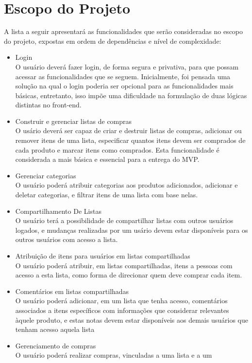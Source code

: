 \section{Escopo do Projeto}
A lista a seguir apresentará as funcionalidades que serão consideradas no escopo do projeto, expostas em
ordem de dependências e nível de complexidade:
\begin{itemize}
\item Login\\
  O usuário deverá fazer login, de forma segura e privativa, para que
  possam acessar as funcionalidades que se seguem. Inicialmente, foi
  pensada uma solução na qual o login poderia ser opcional para as
  funcionalidades mais básicas, entretanto, isso impõe uma dificuldade
  na formulação de duas lógicas distintas no front-end.
\item Construir e gerenciar listas de compras\\
  O usário deverá ser capaz de criar e destruir listas de compras, adicionar ou
  remover itens de uma lista, especificar quantos itens devem ser
  comprados de cada produto e marcar itens como comprados. Esta
  funcionalidade é considerada a mais básica e essencial para a
  entrega do MVP.
\item Gerenciar categorias\\
  O usuário poderá atribuir categorias aos produtos adicionados,
  adicionar e deletar categorias, e filtrar itens de uma lista com base nelas.
\item Compartilhamento De Listas\\
  O usuário terá a possibilidade de compartilhar listas com outros
  usuários logados, e mudanças realizadas por um usário devem estar
  disponíveis para os outros usuários com acesso a lista.
\item Atribuição de itens para usuários em listas compartilhadas\\
  O usuário poderá atribuir, em listas compartilhadas, itens a pessoas
  com acesso a esta lista, como forma de direcionar quem deve comprar
  cada item.
\item Comentários em listas compartilhadas\\
  O usuário poderá adicionar, em um lista que tenha acesso,
  comentários associados a itens específicos com informações que
  considerar relevantes àquele produto, e estas notas devem estar
  disponíveis aos demais usuários que tenham acesso aquela lista
\item Gerenciamento de compras\\
  O usuário poderá realizar compras, vinculadas a uma lista e a um

\end{itemize}
